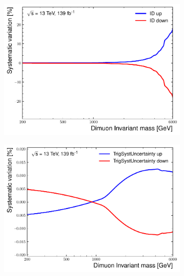 \begin{figure}[]
\begin{subfigure}[b]{0.42\textwidth}
        \label{fig:uncert:mmMC}
    \end{subfigure}
    \begin{subfigure}[b]{0.42\textwidth}
        \centering
        \includegraphics[width=\textwidth]{figures/analysis/datamc/Uncertainties/exp/mm/m_uu_pstOR_MUON_ID__1up.pdf}
        \label{fig:uncert:mmID}
    \end{subfigure}
    \begin{subfigure}[b]{0.42\textwidth}
        \centering
        \includegraphics[width=\textwidth]{figures/analysis/datamc/Uncertainties/exp/mm/m_uu_pstOR_MUON_EFF_TrigSystUncertainty__1up.pdf}
        \label{fig:uncert:mmTrig}
    \end{subfigure}
    \begin{subfigure}[b]{0.42\textwidth}

\end{subfigure}
\end{figure}
